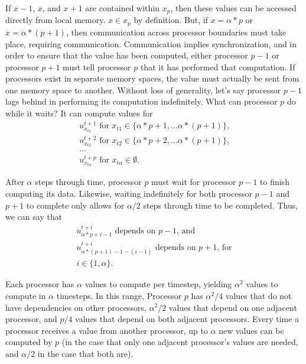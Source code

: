 If $x-1$, $x$, and $x+1$ are contained within $x_p$, then these values can be
accessed directly from local memory. $x \in x_p$ by definition. But, if $x =
\alpha*p$ or $x = \alpha*(p+1)$, then communication across processor boundaries
must take place, requiring communication. Communication implies synchronization,
and in order to ensure that the value has been computed, either processor $p-1$
or processor $p+1$ must tell processor $p$ that it has performed that
computation. If processors exist in separate memory spaces, the value must
actually be sent from one memory space to another. Without loss of generality,
let's say processor $p-1$ lags behind in performing its computation
indefinitely. What can processor $p$ do while it waits? It can compute values
for
\begin{align*} 
    u^{t+1}_{x_{t1}} \text{ for } x_{t1} \in \{ \alpha*p + 1, \dots \alpha*(p+1) \} \text{,} \\
    u^{t+2}_{x_{t2}} \text{ for } x_{t2} \in \{ \alpha*p + 2, \dots \alpha*(p+1) \} \text{,} \\
    ... \\
    u^{t+p}_{x_{t\alpha}} \text{ for } x_{t\alpha} \in \emptyset \text{.}
\end{align*}

After $\alpha$ steps through time, processor $p$ must wait for processor $p-1$ to
finish computing its data. Likewise, waiting indefinitely for both processor
$p-1$ and $p+1$ to complete only allows for $\alpha / 2$ steps through time to be
completed. Thus, we can say that
\begin{align*}
    u^{t + i}_{\alpha*p + i-1} \text{ depends on } p-1 \text{, and} \\
    u^{t + i}_{\alpha*(p+1)-1 - (i-1)} \text{ depends on } p+1 \text{, for} \\
    i \in \{ 1, \alpha \} \text{.}
\end{align*}

Each processor has $\alpha$ values to compute per timestep, yielding $\alpha^2$
values to compute in $\alpha$ timesteps. In this range, Processor $p$ has
$\alpha^2/4$ values that do not have dependencies on other processors,
$\alpha^2/2$ values that depend on one adjacent processor, and $p/4$ values that
depend on both adjacent processors. Every time a processor receives a value from
another processor, up to $\alpha$ new values can be computed by $p$ (in the case
that only one adjacent processor's values are needed, and $\alpha/2$ in the case
that both are).


